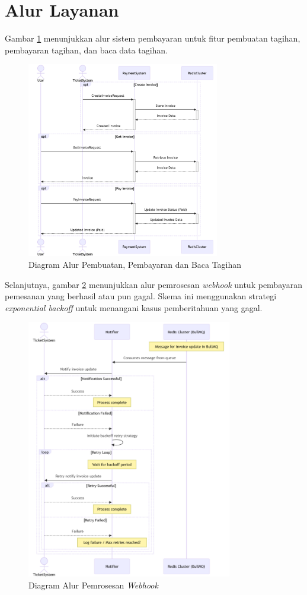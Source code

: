 \section{Alur Layanan}

Gambar \ref{fig:payment-flow1} menunjukkan alur sistem pembayaran untuk fitur pembuatan tagihan, pembayaran tagihan, dan baca data tagihan.

\begin{figure}[htbp]
    \centering
    \includegraphics[width=0.75\textwidth]{resources/chapter-3/payment-flow1.png}
    \caption{Diagram Alur Pembuatan, Pembayaran dan Baca Tagihan}
    \label{fig:payment-flow1}
\end{figure}

\pagebreak

Selanjutnya, gambar \ref{fig:payment-flow2} menunjukkan alur pemrosesan \textit{webhook} untuk pembayaran pemesanan yang berhasil atau pun gagal. Skema ini menggunakan strategi \textit{exponential backoff} untuk menangani kasus pemberitahuan yang gagal.

\begin{figure}[htbp]
    \centering
    \includegraphics[width=0.8\textwidth]{resources/chapter-3/payment-flow2.png}
    \caption{Diagram Alur Pemrosesan \textit{Webhook}}
    \label{fig:payment-flow2}
\end{figure}